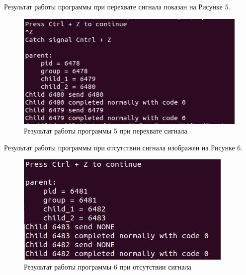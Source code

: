 \documentclass[14pt, a4paper]{extarticle}
\begin{document}
 	Результат работы программы при перехвате сигнала показан на Рисунке 5.
 	\begin{figure}[h!]
 		\centering
 		\includegraphics[scale=1]{source/5}
 		\caption{Результат работы программы 5 при перехвате сигнала}
 	\end{figure}
 	
	Результат работы программы при отсутствии сигнала изображен на Рисунке 6.
	\begin{figure}[h!]
		\centering
		\includegraphics[scale=1]{source/6}
		\caption{Результат работы программы 6 при отсутствии сигнала}
	\end{figure}
\end{document}
